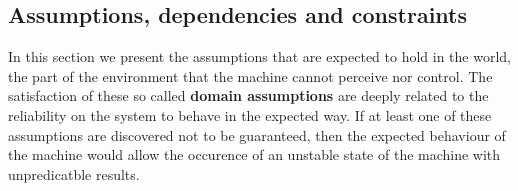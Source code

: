 \subsection{Assumptions, dependencies and constraints}
\label{sec:domain_assumptions}
In this section we present the assumptions that are expected to hold in the world, the part of the environment that the machine cannot perceive nor control. The satisfaction of these so called \textbf{domain assumptions} are deeply related to the reliability on the system to behave in the expected way. If at least one of these assumptions are discovered not to be guaranteed, then the expected behaviour of the machine would allow the occurence of an unstable state of the machine with unpredicatble results.
\newline\newline
{}
\newline\newline
{}
\newline\newline
{}

